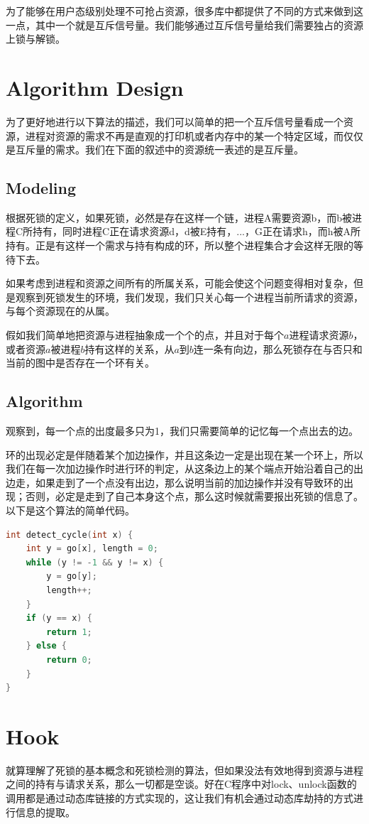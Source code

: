 \documentclass[titlepage]{article}
\begin{document}
\indent 为了能够在用户态级别处理不可抢占资源，很多库中都提供了不同的方式来做到这一点，其中一个就是互斥信号量。我们能够通过互斥信号量给我们需要独占的资源上锁与解锁。

\section{Algorithm Design}
\indent 为了更好地进行以下算法的描述，我们可以简单的把一个互斥信号量看成一个资源，进程对资源的需求不再是直观的打印机或者内存中的某一个特定区域，而仅仅是互斥量的需求。我们在下面的叙述中的资源统一表述的是互斥量。
\subsection{Modeling}
\indent 根据死锁的定义，如果死锁，必然是存在这样一个链，进程A需要资源b，而b被进程C所持有，同时进程C正在请求资源d，d被E持有，...，G正在请求h，而h被A所持有。正是有这样一个需求与持有构成的环，所以整个进程集合才会这样无限的等待下去。

\indent 如果考虑到进程和资源之间所有的所属关系，可能会使这个问题变得相对复杂，但是观察到死锁发生的环境，我们发现，我们只关心每一个进程当前所请求的资源，与每个资源现在的从属。

\indent 假如我们简单地把资源与进程抽象成一个个的点，并且对于每个$a$进程请求资源$b$，或者资源$a$被进程$b$持有这样的关系，从$a$到$b$连一条有向边，那么死锁存在与否只和当前的图中是否存在一个环有关。

\subsection{Algorithm}
\indent 观察到，每一个点的出度最多只为1，我们只需要简单的记忆每一个点出去的边。

\indent 环的出现必定是伴随着某个加边操作，并且这条边一定是出现在某一个环上，所以我们在每一次加边操作时进行环的判定，从这条边上的某个端点开始沿着自己的出边走，如果走到了一个点没有出边，那么说明当前的加边操作并没有导致环的出现；否则，必定是走到了自己本身这个点，那么这时候就需要报出死锁的信息了。以下是这个算法的简单代码。

\begin{lstlisting}[language=C]
int detect_cycle(int x) {
    int y = go[x], length = 0;
    while (y != -1 && y != x) {
        y = go[y];
        length++;
    }
    if (y == x) {
        return 1;
    } else {
        return 0;
    }
}
\end{lstlisting}

\section{Hook}
\indent 就算理解了死锁的基本概念和死锁检测的算法，但如果没法有效地得到资源与进程之间的持有与请求关系，那么一切都是空谈。好在C程序中对lock、unlock函数的调用都是通过动态库链接的方式实现的，这让我们有机会通过动态库劫持的方式进行信息的提取。
\end{document}
